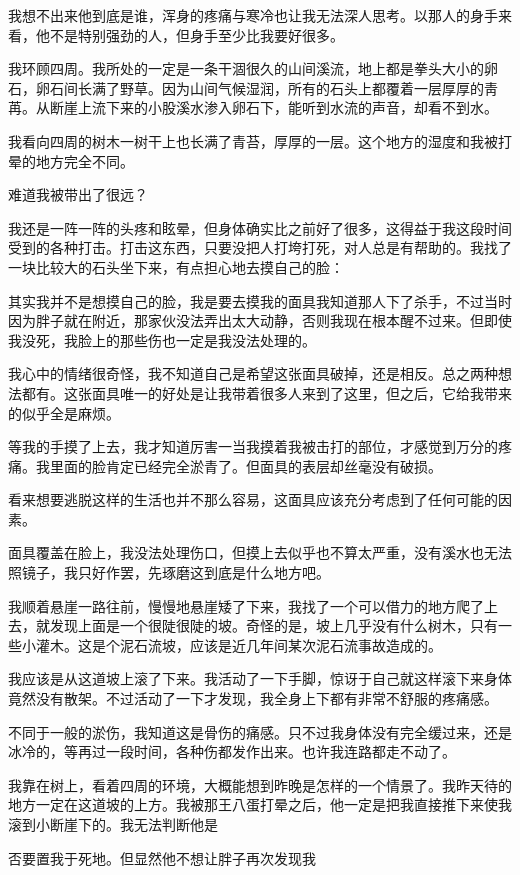 我想不出来他到底是谁，浑身的疼痛与寒冷也让我无法深人思考。以那人的身手来看，他不是特别强劲的人，但身手至少比我要好很多。

我环顾四周。我所处的一定是一条干涸很久的山间溪流，地上都是拳头大小的卵石，卵石间长满了野草。因为山间气候湿润，所有的石头上都覆着一层厚厚的靑苒。从断崖上流下来的小股溪水渗入卵石下，能听到水流的声音，却看不到水。

我看向四周的树木一树干上也长满了青苔，厚厚的一层。这个地方的湿度和我被打晕的地方完全不同。

难道我被带出了很远？

我还是一阵一阵的头疼和眩晕，但身体确实比之前好了很多，这得益于我这段时间受到的各种打击。打击这东西，只要没把人打垮打死，对人总是有帮助的。我找了一块比较大的石头坐下来，有点担心地去摸自己的脸：

其实我并不是想摸自己的脸，我是要去摸我的面具我知道那人下了杀手，不过当时因为胖子就在附近，那家伙没法弄出太大动静，否则我现在根本醒不过来。但即使我没死，我脸上的那些伤也一定是我没法处理的。

我心中的情绪很奇怪，我不知道自己是希望这张面具破掉，还是相反。总之两种想法都有。这张面具唯一的好处是让我带着很多人来到了这里，但之后，它给我带来的似乎全是麻烦。

等我的手摸了上去，我才知道厉害一当我摸着我被击打的部位，才感觉到万分的疼痛。我里面的脸肯定已经完全淤青了。但面具的表层却丝毫没有破损。

看来想要逃脱这样的生活也并不那么容易，这面具应该充分考虑到了任何可能的因素。

面具覆盖在脸上，我没法处理伤口，但摸上去似乎也不算太严重，没有溪水也无法照镜子，我只好作罢，先琢磨这到底是什么地方吧。

我顺着悬崖一路往前，慢慢地悬崖矮了下来，我找了一个可以借力的地方爬了上去，就发现上面是一个很陡很陡的坡。奇怪的是，坡上几乎没有什么树木，只有一些小灌木。这是个泥石流坡，应该是近几年间某次泥石流事故造成的。

我应该是从这道坡上滚了下来。我活动了一下手脚，惊讶于自己就这样滚下来身体竟然没有散架。不过活动了一下才发现，我全身上下都有非常不舒服的疼痛感。

不同于一般的淤伤，我知道这是骨伤的痛感。只不过我身体没有完全缓过来，还是冰冷的，等再过一段时间，各种伤都发作出来。也许我连路都走不动了。

我靠在树上，看着四周的环境，大概能想到昨晚是怎样的一个情景了。我昨天待的地方一定在这道坡的上方。我被那王八蛋打晕之后，他一定是把我直接推下来使我滚到小断崖下的。我无法判断他是

否要置我于死地。但显然他不想让胖子再次发现我

